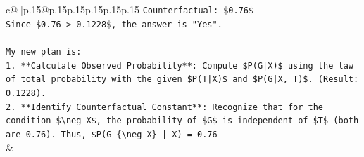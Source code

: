 \documentclass{article}
\begin{document}
{\begin{supertabular}{c@{$\;$}|p{.15\linewidth}@{}p{.15\linewidth}p{.15\linewidth}p{.15\linewidth}p{.15\linewidth}p{.15\linewidth}}
{{{\texttt{Counterfactual: \$0.76\$} \\
\texttt{Since \$0.76 > 0.1228\$, the answer is "Yes".} \\
\\ 
\texttt{My new plan is:} \\
\texttt{1.  **Calculate Observed Probability**: Compute \$P(G|X)\$ using the law of total probability with the given \$P(T|X)\$ and \$P(G|X, T)\$. (Result: 0.1228).} \\
\texttt{2.  **Identify Counterfactual Constant**: Recognize that for the condition \$\textbackslash{}neg X\$, the probability of \$G\$ is independent of \$T\$ (both are 0.76). Thus, \$P(G\_\{\textbackslash{}neg X\} | X) = 0.76} \\
            }
        }
    }
    & \\ \\

\end{supertabular}
}
\end{document}
